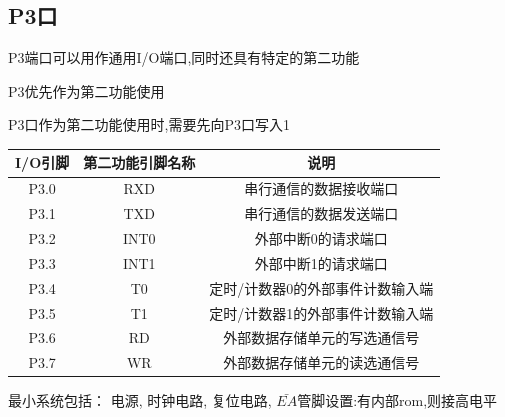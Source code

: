 \documentclass[12pt,a4paper,oneside]{ctexart}
\begin{document}
\subsection{P3口}
P3端口可以用作通用I/O端口,同时还具有特定的第二功能

P3优先作为第二功能使用

P3口作为第二功能使用时,需要先向P3口写入1
\begin{table}[H]
    \centering
    \begin{tabular}{|c|c|c|}
    \hline
    I/O引脚 & 第二功能引脚名称 & 说明                \\ \hline
    P3.0  & RXD      & 串行通信的数据接收端口       \\ \hline
    P3.1  & TXD      & 串行通信的数据发送端口       \\ \hline
    P3.2  & INT0     & 外部中断0的请求端口        \\ \hline
    P3.3  & INT1     & 外部中断1的请求端口        \\ \hline
    P3.4  & T0       & 定时/计数器0的外部事件计数输入端 \\ \hline
    P3.5  & T1       & 定时/计数器1的外部事件计数输入端 \\ \hline
    P3.6  & RD       & 外部数据存储单元的写选通信号    \\ \hline
    P3.7  & WR       & 外部数据存储单元的读选通信号    \\ \hline
    \end{tabular}
\end{table}


最小系统包括：
电源,
时钟电路,
复位电路,
$\bar{EA}$管脚设置:有内部rom,则接高电平
\end{document}
